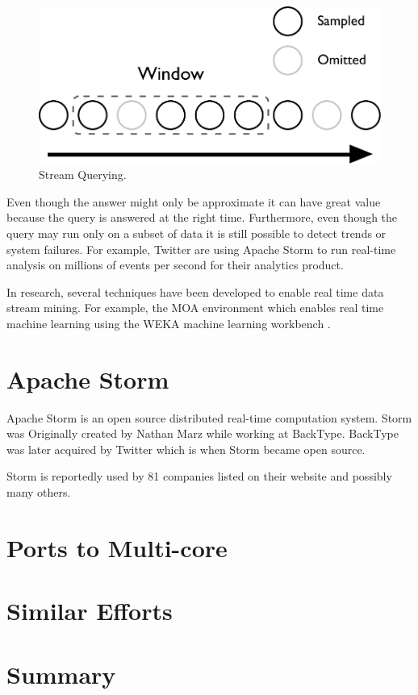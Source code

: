 \begin{figure}[!htb]
	\centering
	\includegraphics[scale=0.5]{pdf/stream.pdf}
	\caption{Stream Querying.}
	\label{fig:stream}
\end{figure}

Even though the answer might only be approximate it can have great value because the query is answered at the right time. Furthermore, even though the query may run only on a subset of data it is still possible to detect trends or system failures. For example, Twitter are using Apache Storm to run real-time analysis on millions of events per second for their analytics product. \cite{Solovey}

In research, several techniques have been developed to enable real time data stream mining. For example, the MOA environment \cite{Bifet:2010:MMO:1756006.1859903} which enables real time machine learning using the WEKA machine learning workbench \cite{Holmes1994}.

\section{Apache Storm}


Apache Storm is an open source distributed real-time computation system. Storm was Originally created by Nathan Marz while working at BackType. \cite{NathanAbout} BackType was later acquired by Twitter which is when Storm became open source.


Storm is reportedly used by 81 companies listed on their website \cite{https://storm.apache.org/documentation/Powered-By.html} and possibly many others. 


\section{Ports to Multi-core}

\section{Similar Efforts}




\section{Summary}